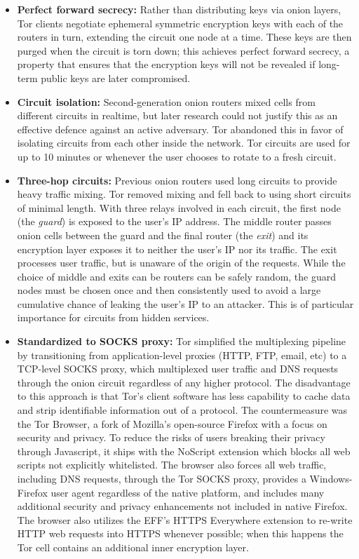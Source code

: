 \begin{itemize}
	\item \textbf{Perfect forward secrecy:} Rather than distributing keys via onion layers, Tor clients negotiate ephemeral symmetric encryption keys with each of the routers in turn, extending the circuit one node at a time. These keys are then purged when the circuit is torn down; this achieves perfect forward secrecy, a property that ensures that the encryption keys will not be revealed if long-term public keys are later compromised.
	\item \textbf{Circuit isolation:} Second-generation onion routers mixed cells from different circuits in realtime, but later research could not justify this as an effective defence against an active adversary.\cite{syverson2011peel} Tor abandoned this in favor of isolating circuits from each other inside the network. Tor circuits are used for up to 10 minutes or whenever the user chooses to rotate to a fresh circuit.
	\item \textbf{Three-hop circuits:} Previous onion routers used long circuits to provide heavy traffic mixing. Tor removed mixing and fell back to using short circuits of minimal length. With three relays involved in each circuit, the first node (the \emph{guard}) is exposed to the user's IP address. The middle router passes onion cells between the guard and the final router (the \emph{exit}) and its encryption layer exposes it to neither the user's IP nor its traffic. The exit processes user traffic, but is unaware of the origin of the requests. While the choice of middle and exits can be routers can be safely random, the guard nodes must be chosen once and then consistently used to avoid a large cumulative chance of leaking the user's IP to an attacker. This is of particular importance for circuits from hidden services.\cite{bauer2007low}\cite{overlier2006locating}
	\item \textbf{Standardized to SOCKS proxy:} Tor simplified the multiplexing pipeline by transitioning from application-level proxies (HTTP, FTP, email, etc) to a TCP-level SOCKS proxy, which multiplexed user traffic and DNS requests through the onion circuit regardless of any higher protocol. The disadvantage to this approach is that Tor's client software has less capability to cache data and strip identifiable information out of a protocol. The countermeasure was the Tor Browser, a fork of Mozilla's open-source Firefox with a focus on security and privacy. To reduce the risks of users breaking their privacy through Javascript, it ships with the NoScript extension which blocks all web scripts not explicitly whitelisted. The browser also forces all web traffic, including DNS requests, through the Tor SOCKS proxy, provides a Windows-Firefox user agent regardless of the native platform, and includes many additional security and privacy enhancements not included in native Firefox. The browser also utilizes the EFF's HTTPS Everywhere extension to re-write HTTP web requests into HTTPS whenever possible; when this happens the Tor cell contains an additional inner encryption layer.

\end{itemize}
